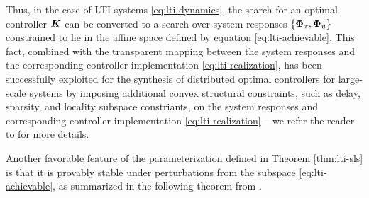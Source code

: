 Thus, in the case of LTI systems \eqref{eq:lti-dynamics}, the search for an optimal controller $\boldsymbol{K}$ can be converted to a search over system responses $\left\{\boldsymbol{\Phi}_x,\boldsymbol{\Phi}_u\right\}$ constrained to lie in the affine space defined by equation \eqref{eq:lti-achievable}.  This fact, combined with the transparent mapping between the system responses and the corresponding controller implementation \eqref{eq:lti-realization}, has been successfully exploited for the synthesis of distributed optimal controllers for large-scale systems by imposing additional convex structural constraints, such as delay, sparsity, and locality subspace constriants, on the system responses and corresponding controller implementation \eqref{eq:lti-realization} -- we refer the reader to \cite{wang2014localized,wang2016localized,wang2018separable} for more details.

Another favorable feature of the parameterization defined in Theorem \ref{thm:lti-sls} is that it is provably stable under perturbations from the subspace \eqref{eq:lti-achievable}, as summarized in the following theorem from \cite{matni2017scalable}.

